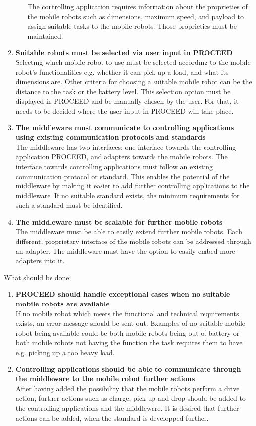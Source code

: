 \begin{enumerate}
\begin{enumerate}
The controlling application requires information about the proprieties of the mobile robots such as dimensions, maximum speed, and payload to assign suitable tasks to the mobile robots. Those proprieties must be maintained.
   \end{enumerate}
     \item\textbf{Suitable robots must be selected via user input in PROCEED} \hfill \\
Selecting which mobile robot to use must be selected according to the mobile robot’s functionalities e.g. whether it can pick up a load, and what its dimensions are. Other criteria for choosing a suitable mobile robot can be the distance to the task or the battery level. This selection option must be displayed in PROCEED and be manually chosen by the user. For that, it needs to be decided where the user input in PROCEED will take place.
   \item \textbf{The middleware must communicate to controlling applications using existing communication protocols and standards} \hfill \\ 
	The middleware has two interfaces: one interface towards the controlling application PROCEED, and adapters towards the mobile robots. The interface towards controlling applications must follow an existing communication protocol or standard. This enables the potential of the middleware by making it easier to add further controlling applications to the middleware. If no suitable standard exists, the minimum requirements for such a standard must be identified.
   \item \textbf{The middleware must be scalable for further mobile robots} \hfill \\ 
	The middleware must be able to easily extend further mobile robots. Each different, proprietary interface of the mobile robots can be addressed through an adapter. The middleware must have the option to easily embed more adapters into it.
\end{enumerate}

What \underline{should} be done:
\begin{enumerate}
   \item \textbf{PROCEED should handle exceptional cases when no suitable mobile robots are available} \hfill \\ 
	If no mobile robot which meets the functional and technical requirements exists, an error message should be sent out. Examples of no suitable mobile robot being available could be both mobile robots being out of battery or both mobile robots not having the function the task requires them to have e.g. picking up a too heavy load.
   \item \textbf{Controlling applications should be able to communicate through the middleware to the mobile robot further actions} \hfill \\ 
	After having added the possibility that the mobile robots perform a drive action, further actions such as charge, pick up and drop should be added to the controlling applications and the middleware. It is desired that further actions can be added, when the standard is developped further.
\end{enumerate}

